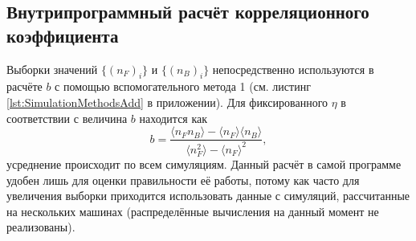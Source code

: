 \subsection{Внутрипрограммный расчёт корреляционного коэффициента}
Выборки значений $\{ (n_F)_i \}$ и $\{ (n_B)_i \}$ непосредственно используются в расчёте $b$ с помощью вспомогательного метода 1 (см. листинг \ref{lst:SimulationMethodsAdd} в приложении). Для фиксированного $\eta$ в соответствии с \cite{bStatement} величина $b$ находится как 
\begin{equation} \label{eq:nfnb}
	b = \frac{\langle n_F n_B \rangle - \langle n_F \rangle \langle n_B \rangle}{\langle n_F^2 \rangle - \langle n_F \rangle^2},
\end{equation}
усреднение происходит по всем симуляциям. Данный расчёт в самой программе удобен лишь для оценки правильности её работы, потому как часто для увеличения выборки приходится использовать данные с симуляций, рассчитанные на нескольких машинах (распределённые вычисления на данный момент не реализованы).